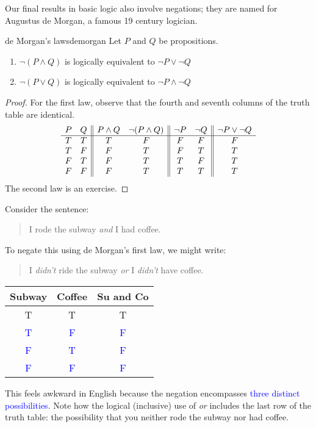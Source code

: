 Our final results in basic logic also involve negations; they are named for Augustus de Morgan, a famous 19\th{} century logician.

\begin{thm}{de Morgan's laws}{demorgan}
	Let $P$ and $Q$ be propositions.
	\begin{enumerate}\itemsep0pt
	  \item $\neg(P\wedge Q)$ is logically equivalent to $\neg P\vee\neg Q$
	  \item $\neg(P\vee Q)$ is logically equivalent to $\neg P\wedge\neg Q$
	\end{enumerate}
\end{thm}

\begin{proof}
	For the first law, observe that the fourth and seventh columns of the truth table are identical.
	\[
		\begin{array}[t]{cc||cc||cc||c}
			P & Q & P\wedge Q & \neg(P\wedge Q) & \neg P & \neg Q & \neg P\vee\neg Q\\\hline
			T & T & T & F & F & F & F\\
			T & F & F & T & F & T & T\\
			F & T & F & T & T & F & T\\
			F & F & F & T & T & T & T
		\end{array}
	\]
	The second law is an exercise.
\end{proof}

\begin{example}{}{}
	Consider the sentence:\par
	\begin{minipage}[t]{0.6\linewidth}\vspace{-1pt}
	\begin{quote}
		I rode the subway \emph{and} I had coffee.
	\end{quote}
	To negate this using de Morgan's first law, we might write:
	\begin{quote}
		I \emph{didn't} ride the subway \emph{or} I \emph{didn't} have coffee.
	\end{quote}
	\end{minipage}
	\hfill
	\begin{minipage}[t]{0.39\linewidth}\vspace{-20pt}
		\flushright	
		\begin{tabular}{c|c||c}
			Subway&Coffee&Su and Co\\\hline\hline
			T & T & T\\
			\textcolor{blue}{T} & \textcolor{blue}{F} & \textcolor{blue}{F}\\
			\textcolor{blue}{F} & \textcolor{blue}{T} & \textcolor{blue}{F}\\
			\textcolor{blue}{F} & \textcolor{blue}{F} &\textcolor{blue}{F}
		\end{tabular}
	\end{minipage}\bigbreak
	
	This feels awkward in English because the negation encompasses \textcolor{blue}{three distinct possibilities}. Note how the logical (inclusive) use of \emph{or} includes the last row of the truth table: the possibility that you neither rode the subway nor had coffee.
\end{example}

